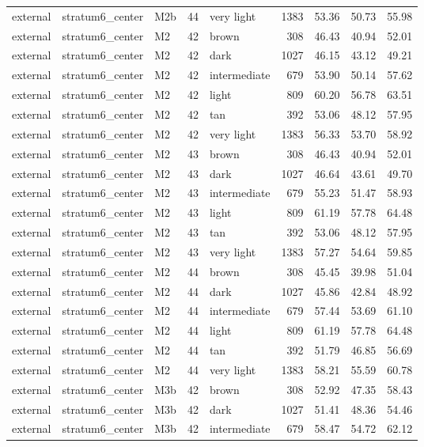 \begin{tabular}{lllrlrrrr}
external & stratum6\_center & M2b & 44 & very light & 1383 & 53.36 & 50.73 & 55.98 \\
external & stratum6\_center & M2 & 42 & brown & 308 & 46.43 & 40.94 & 52.01 \\
external & stratum6\_center & M2 & 42 & dark & 1027 & 46.15 & 43.12 & 49.21 \\
external & stratum6\_center & M2 & 42 & intermediate & 679 & 53.90 & 50.14 & 57.62 \\
external & stratum6\_center & M2 & 42 & light & 809 & 60.20 & 56.78 & 63.51 \\
external & stratum6\_center & M2 & 42 & tan & 392 & 53.06 & 48.12 & 57.95 \\
external & stratum6\_center & M2 & 42 & very light & 1383 & 56.33 & 53.70 & 58.92 \\
external & stratum6\_center & M2 & 43 & brown & 308 & 46.43 & 40.94 & 52.01 \\
external & stratum6\_center & M2 & 43 & dark & 1027 & 46.64 & 43.61 & 49.70 \\
external & stratum6\_center & M2 & 43 & intermediate & 679 & 55.23 & 51.47 & 58.93 \\
external & stratum6\_center & M2 & 43 & light & 809 & 61.19 & 57.78 & 64.48 \\
external & stratum6\_center & M2 & 43 & tan & 392 & 53.06 & 48.12 & 57.95 \\
external & stratum6\_center & M2 & 43 & very light & 1383 & 57.27 & 54.64 & 59.85 \\
external & stratum6\_center & M2 & 44 & brown & 308 & 45.45 & 39.98 & 51.04 \\
external & stratum6\_center & M2 & 44 & dark & 1027 & 45.86 & 42.84 & 48.92 \\
external & stratum6\_center & M2 & 44 & intermediate & 679 & 57.44 & 53.69 & 61.10 \\
external & stratum6\_center & M2 & 44 & light & 809 & 61.19 & 57.78 & 64.48 \\
external & stratum6\_center & M2 & 44 & tan & 392 & 51.79 & 46.85 & 56.69 \\
external & stratum6\_center & M2 & 44 & very light & 1383 & 58.21 & 55.59 & 60.78 \\
external & stratum6\_center & M3b & 42 & brown & 308 & 52.92 & 47.35 & 58.43 \\
external & stratum6\_center & M3b & 42 & dark & 1027 & 51.41 & 48.36 & 54.46 \\
external & stratum6\_center & M3b & 42 & intermediate & 679 & 58.47 & 54.72 & 62.12 \\

\end{tabular}
